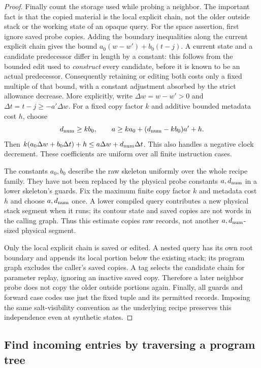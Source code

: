 \documentclass[11pt]{article}
\numberwithin{equation}{section}
\theoremstyle{definition}
\theoremstyle{remark}
\begin{document}
\begin{proof}
Finally count the storage used while probing a neighbor. The important fact is that the copied material is the local explicit chain, not the older outside stack or the working state of an opaque query. For the space assertion, first ignore saved probe copies.  Adding the
boundary inequalities along the current explicit chain gives the bound
$a_0(w-w')+b_0(t-j)$.  A current state and a candidate predecessor differ in
length by a constant: this follows from the bounded edit used to
\emph{construct} every candidate, before it is known to be an actual
predecessor.  Consequently retaining or editing both costs only a fixed
multiple of that bound, with a constant adjustment absorbed by the
strict allowance decrease.  More explicitly, write
$\Delta w=w-w'>0$ and $\Delta t=t-j\ge-a'\Delta w$.  For a fixed copy
factor $k$ and additive bounded metadata cost $h$, choose
\begin{equation}\label{eq:ctrl-copy-coefficients}
 {d_{\rm num}}\ge kb_0,\qquad {a}\ge ka_0+({d_{\rm num}}-kb_0)a'+h.
\end{equation}
Then $k(a_0\Delta w+b_0\Delta t)+h\le {a}\Delta w+{d_{\rm num}}\Delta t$.
This also handles a negative clock decrement.  These coefficients are
uniform over all finite instruction cases.

The constants $a_0,b_0$ describe the raw skeleton uniformly over the
whole recipe family.  They have not been replaced by the physical probe
constants ${a},{d_{\rm num}}$ in a lower skeleton's guards.  Fix the maximum finite
copy factor $k$ and metadata cost $h$ and choose ${a},{d_{\rm num}}$ once.  A lower
compiled query contributes a new physical stack segment when it runs;
its contour state and saved copies are not words in the calling graph.
Thus this estimate copies raw records, not another ${a},{d_{\rm num}}$-sized physical
segment.

Only the local explicit chain is saved or edited.  A nested query has
its own root boundary and appends its local portion below the existing
stack; its program graph excludes the caller's saved copies.  A tag
selects the candidate chain for parameter replay, ignoring an inactive
saved copy.  Therefore a later neighbor probe does not copy the older
outside portions again.  Finally, all guards and forward case codes
use just the fixed tuple and its permitted records.  Imposing the same
salt-visibility convention as the underlying recipe preserves this
independence even at synthetic states.
\end{proof}

\subsection{Find incoming entries by traversing a program tree}\label{sec:ctrl-incoming}
\end{document}
